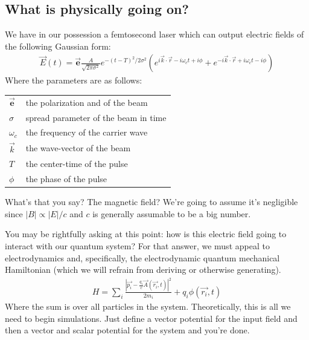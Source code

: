 \subsection{What is physically going on?}
We have in our possession a femtosecond laser which can output electric fields of the following Gaussian form:
\begin{align}
	\vec{E}(t) = \vec{\textbf{e}} \frac{A}{\sqrt{2 \pi \sigma^2}} e^{-(t - T)^2 / 2 \sigma^2} \left( e^{i \vec{k} \cdot \vec{r} - i \omega_c t + i\phi}  + e^{-i \vec{k} \cdot \vec{r} + i \omega_c t - i\phi} \right)
\end{align}
Where the parameters are as follows:
\begin{center}
\begin{tabular}{l | l}
	$\vec{\textbf{e}}$ & the polarization and of the beam \\
	$\sigma$ & spread parameter of the beam in time \\
	$ \omega_c$ & the frequency of the carrier wave \\
	$\vec{k}$ & the wave-vector of the beam\\
	$T$ & the center-time of the pulse \\
	$\phi$ & the phase of the pulse
\end{tabular}
\end{center}
What's that you say?  The magnetic field?  We're going to assume it's negligible since $|B| \propto |E| / c$ and $c$ is generally assumable to be a big number.

You may be rightfully asking at this point: how is this electric field going to interact with our quantum system?  For that answer, we must appeal to electrodynamics and, specifically, the electrodynamic quantum mechanical Hamiltonian (which we will refrain from deriving or otherwise generating).
\begin{align}
	H = \sum_i \frac{\left|  \vec{p_i} - \frac{q_i}{c} \vec{A}(\vec{r_i}, t)  \right|^2}{2 m_i} + q_i \phi(\vec{r_i}, t)
\end{align}
Where the sum is over all particles in the system.  Theoretically, this is all we need to begin simulations.  Just define a vector potential for the input field and then a vector and scalar potential for the system and you're done.

